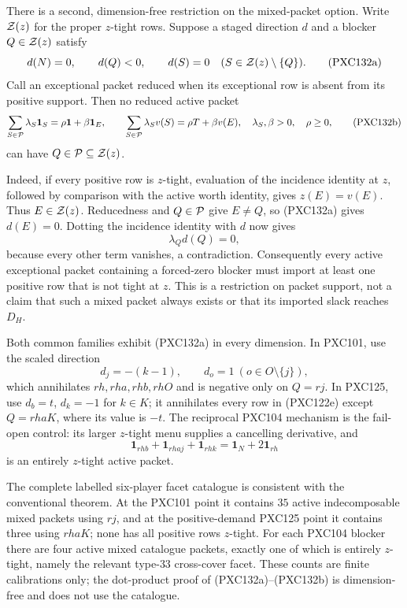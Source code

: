\documentclass[11pt]{article}
\newcommand{\one}{\mathbf 1}
\begin{document}
There is a second, dimension-free restriction on the mixed-packet option.
Write \({\cal Z}(z)\) for the proper \(z\)-tight rows.  Suppose a
staged direction \(d\) and a blocker \(Q\in{\cal Z}(z)\) satisfy
\begin{equation}
 d(N)=0,\qquad d(Q)<0,\qquad
 d(S)=0\quad(S\in{\cal Z}(z)\setminus\{Q\}).          \tag{PXC132a}
\end{equation}
Call an exceptional packet reduced when its exceptional row is absent from
its positive support.  Then no reduced active packet
\begin{equation}
 \sum_{S\in{\cal P}}\lambda_S\one_S
   =\rho\one+\beta\one_E,\qquad
 \sum_{S\in{\cal P}}\lambda_Sv(S)=\rho T+\beta v(E),
 \quad \lambda_S,\beta>0,\quad\rho\ge0,               \tag{PXC132b}
\end{equation}
can have \(Q\in{\cal P}\subseteq{\cal Z}(z)\).

Indeed, if every positive row is \(z\)-tight, evaluation of the incidence
identity at \(z\), followed by comparison with the active worth identity,
gives \(z(E)=v(E)\).  Thus \(E\in{\cal Z}(z)\).  Reducedness and
\(Q\in{\cal P}\) give \(E\ne Q\), so (PXC132a) gives \(d(E)=0\).
Dotting the incidence identity with \(d\) now gives
\[
                  \lambda_Qd(Q)=0,
\]
because every other term vanishes, a contradiction.  Consequently every
active exceptional packet containing a forced-zero blocker must import at
least one positive row that is not tight at \(z\).  This is a restriction
on packet support, not a claim that such a mixed packet always exists or
that its imported slack reaches \(D_H\).

Both common families exhibit (PXC132a) in every dimension.  In PXC101, use
the scaled direction
\[
 d_j=-(k-1),\qquad d_o=1\ (o\in O\setminus\{j\}),
\]
which annihilates \(rh,rha,rhb,rhO\) and is negative only on \(Q=rj\).
In PXC125, use \(d_b=t\), \(d_k=-1\) for \(k\in K\); it annihilates every
row in (PXC122e) except \(Q=rhaK\), where its value is \(-t\).
The reciprocal PXC104 mechanism is the fail-open control: its larger
\(z\)-tight menu supplies a cancelling derivative, and
\[
 \one_{rhb}+\one_{rhaj}+\one_{rhk}
       =\one_N+2\one_{rh}                              \tag{PXC132c}
\]
is an entirely \(z\)-tight active packet.

The complete labelled six-player facet catalogue is consistent with the
conventional theorem.  At the PXC101 point it contains \(35\) active
indecomposable mixed packets using \(rj\), and at the positive-demand PXC125
point it contains three using \(rhaK\); none has all positive rows
\(z\)-tight.  For each PXC104 blocker there are four active mixed catalogue
packets, exactly one of which is entirely \(z\)-tight, namely the relevant
type-\(33\) cross-cover facet.  These counts are finite calibrations only;
the dot-product proof of (PXC132a)--(PXC132b) is dimension-free and does not
use the catalogue.
\end{document}

